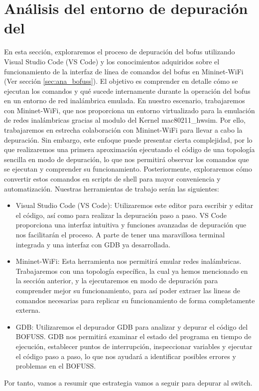 \section{Análisis del entorno de depuración del }
\label{sec:ana_gdb}

En esta sección, exploraremos el proceso de depuración del \gls{bofus} utilizando Visual Studio Code (VS Code) y los conocimientos adquiridos sobre el funcionamiento de la interfaz de línea de comandos  del \gls{bofus} en Mininet-WiFi (Ver sección \ref{sec:ana_bofuss}). El objetivo es comprender en detalle cómo se ejecutan los comandos y qué sucede internamente durante la operación del \gls{bofus} en un entorno de red inalámbrica emulada. En nuestro escenario, trabajaremos con Mininet-WiFi, que nos proporciona un entorno virtualizado para la emulación de redes inalámbricas gracias al modulo del Kernel mac80211\_hwsim. Por ello, trabajaremos en estrecha colaboración con Mininet-WiFi para llevar a cabo la depuración. Sin embargo, este enfoque puede presentar cierta complejidad, por lo que realizaremos una primera aproximación ejecutando el código de una topología sencilla en modo de depuración, lo que nos permitirá observar los comandos que se ejecutan y comprender su funcionamiento. Posteriormente, exploraremos cómo convertir estos comandos en scripts de shell para mayor conveniencia y automatización. Nuestras herramientas de trabajo serán las siguientes:\\

\begin{itemize}
    \item Visual Studio Code (VS Code): Utilizaremos este editor para escribir y editar el código, así como para realizar la depuración paso a paso. VS Code proporciona una interfaz intuitiva y funciones avanzadas de depuración que nos facilitarán el proceso. A parte de tener una maravillosa terminal integrada y una interfaz con GDB ya desarrollada.

    \item Mininet-WiFi: Esta herramienta nos permitirá emular redes inalámbricas. Trabajaremos con una topología específica, la cual ya hemos mencionado en la sección anterior, y la ejecutaremos en modo de depuración para comprender mejor su funcionamiento, para así poder extraer las lineas de comandos necesarias para replicar su funcionamiento de forma completamente externa.

    \item GDB: Utilizaremos el depurador GDB para analizar y depurar el código del BOFUSS. GDB nos permitirá examinar el estado del programa en tiempo de ejecución, establecer puntos de interrupción, inspeccionar variables y ejecutar el código paso a paso, lo que nos ayudará a identificar posibles errores y problemas en el BOFUSS.
\end{itemize}

Por tanto, vamos a resumir que estrategia vamos a seguir para depurar al switch.